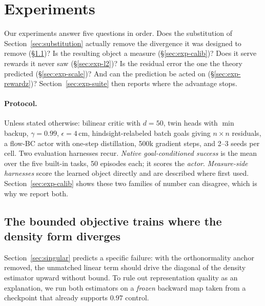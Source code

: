 \section{Experiments}
\label{sec:experiments}

Our experiments answer five questions in order. Does the substitution of
Section~\ref{sec:substitution} actually remove the divergence it was designed to
remove (\S\ref{sec:exp-diverge})? Is the resulting object a measure
(\S\ref{sec:exp-calib})? Does it serve rewards it never saw
(\S\ref{sec:exp-l2})? Is the residual error the one the theory predicted
(\S\ref{sec:exp-scale})? And can the prediction be acted on
(\S\ref{sec:exp-rewardz})? Section~\ref{sec:exp-suite} then reports where the
advantage stops.

\paragraph{Protocol.}
Unless stated otherwise: bilinear critic with $d=50$, twin heads with $\min$
backup, $\gamma=0.99$, $\epsilon=4$\,cm, hindsight-relabeled batch goals giving
$n\times n$ residuals, a flow-BC actor with one-step distillation, 500k gradient
steps, and 2--3 seeds per cell. Two evaluation harnesses recur. \emph{Native
goal-conditioned success} is the mean over the five built-in tasks, 50 episodes
each; it scores the \emph{actor}. \emph{Measure-side harnesses} score the learned
object directly and are described where first used. Section~\ref{sec:exp-calib}
shows these two families of number can disagree, which is why we report both.

\subsection{The bounded objective trains where the density form diverges}
\label{sec:exp-diverge}

Section~\ref{sec:singular} predicts a specific failure: with the orthonormality
anchor removed, the unmatched linear term should drive the diagonal of the density
estimator upward without bound. To rule out representation quality as an
explanation, we run both estimators on a \emph{frozen} backward map taken from a
checkpoint that already supports $0.97$ control.

